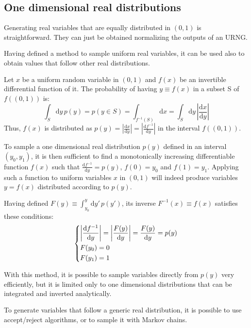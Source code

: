 \subsection*{One dimensional real distributions}

Generating real variables that are equally distributed in $(0,1)$ is straightforward.
They can just be obtained normalizing the outputs of an URNG.

Having defined a method to sample uniform real variables,
it can be used also to obtain values that follow other real distributions.

Let $x$ be a uniform random variable in $(0,1)$ and $f(x)$ be an invertible differential function of it.
The probability of having $y\equiv f(x)$ in a subset S of $f((0,1))$ is:
\[
    \int_S\mathrm dy\,p(y) = p(y\in S) = \int_{f^{-1}(S)}\mathrm dx = \int_S\mathrm dy\,\left|\frac{\mathrm dx}{\mathrm dy}\right|
\]
Thus, $f(x)$ is distributed as $p(y) = \left|\frac{\mathrm dx}{\mathrm dy}\right| = \left|\frac{\mathrm df^{-1}}{\mathrm dy}\right|$ in the interval $f((0,1))$.

To sample a one dimensional real distribution $p(y)$ defined in an interval $(y_0, y_1)$,
it is then sufficient to find a monotonically increasing differentiable function $f(x)$ such that $\frac{\mathrm df^{-1}}{\mathrm dy}=p(y)$, $f(0)=y_0$ and $f(1)=y_1$.
Applying such a function to uniform variables $x$ in $(0,1)$ will indeed produce variables $y=f(x)$ distributed according to $p(y)$.

Having defined $F(y) \equiv \int_{y_0}^y\mathrm dy'\,p(y')$, its inverse $F^{-1}(x) \equiv f(x)$ satisfies these conditions:
\[\begin{dcases}
    \left|\frac{\mathrm df^{-1}}{\mathrm dy}\right| = \left|\frac{F(y)}{\mathrm dy}\right| = \frac{F(y)}{\mathrm dy} = p(y) \\
    F(y_0) = 0 \\
    F(y_1) = 1
\end{dcases}\]

With this method, it is possible to sample variables directly from $p(y)$ very efficiently,
but it is limited only to one dimensional distributions that can be integrated and inverted analytically.

To generate variables that follow a generic real distribution, it is possible to use accept/reject algorithms,
or to sample it with Markov chains.

